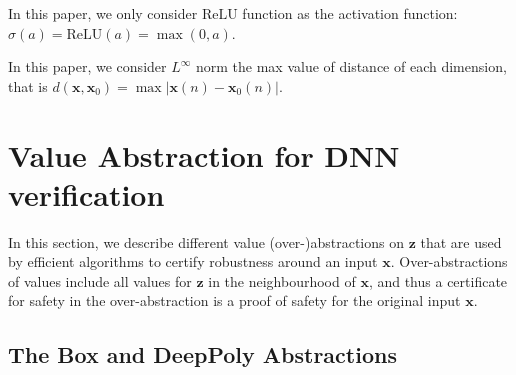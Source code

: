\documentclass{llncs}
\newcommand{\vx}{\boldsymbol{x}}
\newcommand{\vz}{\boldsymbol{z}}
\newcommand{\ReLU}{\mathrm{ReLU}}
\begin{document}
In this paper, we only consider $\ReLU$ function as the activation function: $\sigma(a)=\ReLU(a)=\max(0,a)$. 

In this paper, we consider $L^{\infty}$ norm the max value of distance of each dimension, that is $d(\vx,\boldsymbol{x}_0)=\max |\boldsymbol{x}(n)-\boldsymbol{x}_0(n)|$. 
\fi


\section{Value Abstraction for DNN verification}

In this section, we describe different value (over-)abstractions on $\vz$ that are used by efficient algorithms to certify robustness around an input $\vx$. Over-abstractions of values include all values for $\vz$ in the neighbourhood of $\vx$, and thus a certificate for safety in the over-abstraction is a proof of safety for the original input $\vx$.

\subsection{The Box and DeepPoly Abstractions}

	
\end{document}
